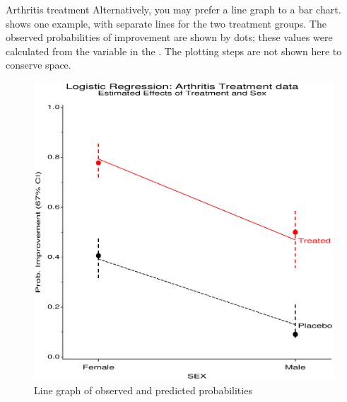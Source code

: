 \begin{Example}[arthrit9]{Arthritis treatment}
Alternatively, you may prefer a line graph to a bar chart.
 shows one example, with separate lines
for the two treatment groups.
The observed probabilities of improvement are shown by dots;
these values were calculated from the  variable
in the  \Dset.
The plotting steps are not shown here to conserve space.
\begin{figure}[!htb]
  \centering
  \includegraphics[scale=.7]{ch6/fig/glogist11}
  \caption{Line graph of observed and predicted probabilities}\label{fig:glogist11}
\end{figure}
\end{Example}
 
